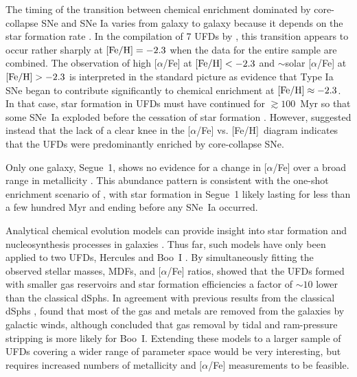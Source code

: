 \documentclass[a4paper]{ar-1col}
\newcommand{\feh}         {[Fe/H]}
\begin{document}
The timing of the transition between chemical enrichment dominated by
core-collapse SNe and SNe Ia varies from galaxy to galaxy because it
depends on the star formation rate \citep[e.g.,][]{venn04,kirby11}.
In the compilation of 7 UFDs by \citet{vargas13}, this transition
appears to occur rather sharply at ${\rm \feh} = -2.3$ when the data
for the entire sample are combined.  The observation of high
[$\alpha$/Fe] at ${\rm \feh} < -2.3$ and $\sim$solar [$\alpha$/Fe] at
${\rm \feh} > -2.3$ is interpreted in the standard picture as evidence
that Type Ia SNe began to contribute significantly to chemical
enrichment at ${\rm \feh} \approx -2.3$.  In that case, star formation
in UFDs must have continued for $\gtrsim100$~Myr so that some SNe~Ia
exploded before the cessation of star formation
\citep[e.g.,][]{vargas13}.  However, \citet{jeon17} suggested instead
that the lack of a clear knee in the [$\alpha$/Fe] vs. \feh\ diagram
indicates that the UFDs were predominantly enriched by core-collapse
SNe.

Only one galaxy, Segue~1, shows no evidence for a change in
[$\alpha$/Fe] over a broad range in metallicity
\citep{vargas13,fsk14}.  This abundance pattern is consistent with the
one-shot enrichment scenario of \citet[][although see
  \citealt{webster16} for alternative possibilities]{fb12}, with star
formation in Segue~1 likely lasting for less than a few hundred Myr
and ending before any SNe~Ia occurred.

Analytical chemical evolution models can provide insight into star
formation and nucleosynthesis processes in galaxies \citep[e.g.,][see
  \citealt{at76} and \citealt{nomoto13} for reviews]{ss72}.  Thus far,
such models have only been applied to two UFDs, Hercules and Boo~I
\citep{vincenzo14, romano15}.  By simultaneously fitting the observed
stellar masses, MDFs, and [$\alpha$/Fe] ratios, \citet{vincenzo14}
showed that the UFDs formed with smaller gas reservoirs and star
formation efficiencies a factor of $\sim10$ lower than the classical
dSphs.  In agreement with previous results from the classical dSphs
\citep[e.g.,][]{kirby11b}, \citet{vincenzo14} found that most of the
gas and metals are removed from the galaxies by galactic winds,
although \citet{romano15} concluded that gas removal by tidal and
ram-pressure stripping is more likely for Boo~I.  Extending these
models to a larger sample of UFDs covering a wider range of parameter
space would be very interesting, but requires increased numbers of
metallicity and $[\alpha$/Fe] measurements to be feasible.
\end{document}
